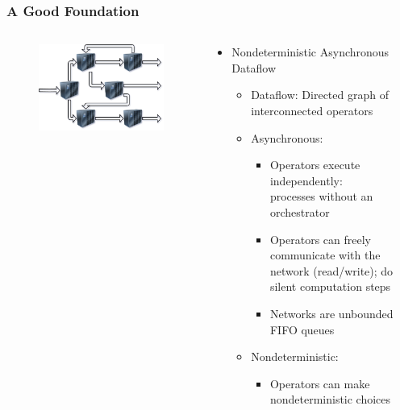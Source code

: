 \documentclass[fleqn,aspectratio=169,10pt]{beamer}
\begin{document}
\begin{frame}[fragile]
  \frametitle{A Good Foundation}
  \begin{columns}
    \begin{column}{.35\textwidth}
      \begin{figure}
        \centering
        \includegraphics[width=1\textwidth]{network.png}
      \end{figure}
    \end{column}
    \begin{column}{.65\textwidth}
      \begin{itemize}
        \item Nondeterministic Asynchronous Dataflow
              \begin{itemize}
                \pause
                \item Dataflow: Directed graph of interconnected operators
                \pause
                \item Asynchronous:
                      \begin{itemize}
                        \item Operators execute independently:\\ processes without an orchestrator
                        \item Operators can freely communicate with the network (read/write); do silent computation steps
                        \item Networks are unbounded FIFO queues
                      \end{itemize}
                \pause
                \item Nondeterministic:
                      \begin{itemize}
                        \item Operators can make nondeterministic choices
                      \end{itemize}
              \end{itemize}
      \end{itemize}
    \end{column}
  \end{columns}
\end{frame}
\end{document}
